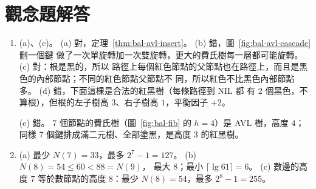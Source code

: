 \section*{觀念題解答}

\begin{enumerate}
\item (a)、(c)。
(a) 對，定理~\ref{thm:bal-avl-insert}。 (b) 錯，圖~\ref{fig:bal-avl-cascade} 刪一個鍵
做了一次單旋轉加一次雙旋轉，更大的費氏樹每一層都可能旋轉。 (c) 對：根是黑的，所以
路徑上每個紅色節點的父節點也在路徑上，而且是黑色的內部節點；不同的紅色節點父節點不
同，所以紅色不比黑色內部節點多。 (d) 錯，下面這棵是合法的紅黑樹（每條路徑到 NIL 都
有 $2$ 個黑色，不算根），但根的左子樹高 $3$、右子樹高 $1$，平衡因子 $+2$。
\begin{center}
\end{center}
(e) 錯。 $7$ 個節點的費氏樹（圖~\ref{fig:bal-fib} 的 $h = 4$）是 AVL 樹，高度 $4$；
同樣 $7$ 個鍵排成滿二元樹、全部塗黑，是高度 $3$ 的紅黑樹。

\item (a) 最少 $N(7) = 33$，最多 $2^7 - 1 = 127$。 (b) $N(8) = 54 \le 60 < 88 = N(9)$，
最大 $8$；最小 $\lceil \lg 61 \rceil = 6$。 (c) 數邊的高度 $7$ 等於數節點的高度
$8$：最少 $N(8) = 54$，最多 $2^8 - 1 = 255$。


\end{enumerate}
